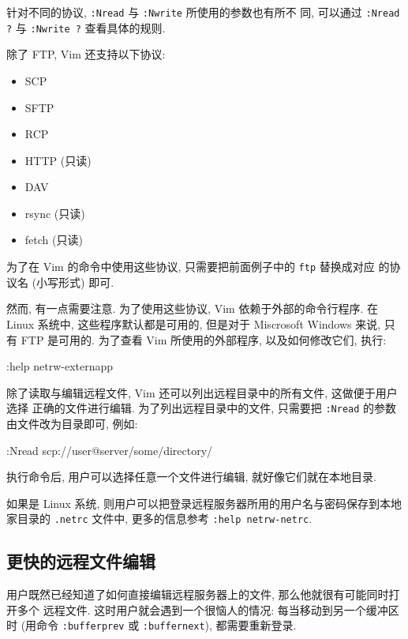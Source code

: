 \begin{warning}
    针对不同的协议, \texttt{:Nread} 与 \texttt{:Nwrite} 所使用的参数也有所不
    同, 可以通过 \texttt{:Nread ?} 与 \texttt{:Nwrite ?} 查看具体的规则.
\end{warning}

除了 FTP, Vim 还支持以下协议:
\begin{itemize}
    \item SCP
    \item SFTP
    \item RCP
    \item HTTP (只读)
    \item DAV
    \item rsync (只读)
    \item fetch (只读)
\end{itemize}

为了在 Vim 的命令中使用这些协议, 只需要把前面例子中的 \texttt{ftp} 替换成对应
的协议名 (小写形式) 即可.

然而, 有一点需要注意. 为了使用这些协议, Vim 依赖于外部的命令行程序. 在 Linux
系统中, 这些程序默认都是可用的, 但是对于 Miscrosoft Windows 来说, 只有 FTP
是可用的. 为了查看 Vim 所使用的外部程序, 以及如何修改它们, 执行:
\begin{vimcode}
:help netrw-externapp
\end{vimcode}

除了读取与编辑远程文件, Vim 还可以列出远程目录中的所有文件, 这做便于用户选择
正确的文件进行编辑. 为了列出远程目录中的文件, 只需要把 \texttt{:Nread} 的参数
由文件改为目录即可, 例如:
\begin{vimcode}
:Nread scp://user@server/some/directory/
\end{vimcode}
执行命令后, 用户可以选择任意一个文件进行编辑, 就好像它们就在本地目录.

\begin{warning}
    如果是 Linux 系统, 则用户可以把登录远程服务器所用的用户名与密码保存到本地
    家目录的 \texttt{.netrc} 文件中, 更多的信息参考 \texttt{:help netrw-netrc}.
\end{warning}

\subsection{更快的远程文件编辑}
\label{subsec:faster_remote_file_editing}

用户既然已经知道了如何直接编辑远程服务器上的文件, 那么他就很有可能同时打开多个
远程文件. 这时用户就会遇到一个很恼人的情况: 每当移动到另一个缓冲区时 (用命令
\texttt{:bufferprev} 或 \texttt{:buffernext}), 都需要重新登录.

